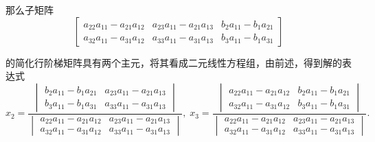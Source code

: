 \documentclass[10pt,openany]{article}
\theoremstyle{thmstyle} %
\theoremstyle{defstyle} %
\theoremstyle{prostyle} %
\theoremstyle{exastyle}
\theoremstyle{remstyle}
\begin{document}
那么子矩阵
\[ \begin{bmatrix}
	a_{22} a_{11} - a_{21} a_{12} & a_{23} a_{11} - a_{21} a_{13} & b_2 a_{11} - b_1 a_{21} \\[2ex]
	 a_{32} a_{11} - a_{31} a_{12} & a_{33} a_{11} - a_{31} a_{13} & b_3 a_{11} - b_1 a_{31}
\end{bmatrix} \]

的简化行阶梯矩阵具有两个主元，将其看成二元线性方程组，由前述，得到解的表达式
\[ x_2=\frac{\begin{vmatrix}
		b_2 a_{11} - b_1 a_{21} & a_{23} a_{11} - a_{21} a_{13} \\ b_3 a_{11} - b_1 a_{31} & a_{33} a_{11} - a_{31} a_{13}
\end{vmatrix}}{\begin{vmatrix}
		a_{22} a_{11} - a_{21} a_{12} & a_{23} a_{11} - a_{21} a_{13} \\ a_{32} a_{11} - a_{31} a_{12} & a_{33} a_{11} - a_{31} a_{13}
\end{vmatrix}}, \; x_3=\frac{\begin{vmatrix}
		a_{22} a_{11} - a_{21} a_{12} & b_2 a_{11} - b_1 a_{21} \\ a_{32} a_{11} - a_{31} a_{12} & b_3 a_{11} - b_1 a_{31}
\end{vmatrix}}{\begin{vmatrix}
a_{22} a_{11} - a_{21} a_{12} & a_{23} a_{11} - a_{21} a_{13} \\ a_{32} a_{11} - a_{31} a_{12} & a_{33} a_{11} - a_{31} a_{13}
\end{vmatrix}}. \]
\end{document}
